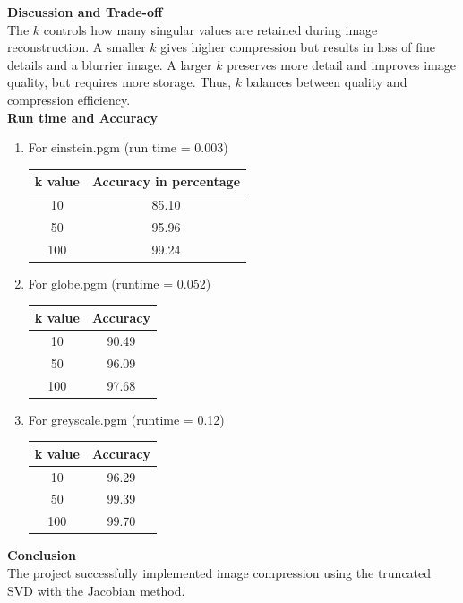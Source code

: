 \documentclass[journal]{IEEEtran}
\begin{document}
\textbf{Discussion and Trade-off}\\
The $k$ controls how many singular values are retained during image reconstruction.  
A smaller \(k\) gives higher compression but results in loss of fine details and a blurrier image.  
A larger \(k\) preserves more detail and improves image quality, but requires more storage.  
Thus, \(k\) balances between quality and compression efficiency.\\


\textbf{Run time and Accuracy}

\begin{enumerate}

\item For einstein.pgm 
(run time = 0.003)
\begin{table}[H]
    \centering
    \begin{tabular}{|c|c|}
        \hline
        \textbf{k value} & \textbf{Accuracy in percentage } \\  
        \hline
        10 & 85.10 \\                              
        \hline
        50 & 95.96 \\                         
        \hline
        100 & 99.24 \\       
        \hline
    \end{tabular}
       \label{tab:1}
\end{table}

\item For globe.pgm
(runtime = 0.052)
\begin{table}[H]
    \centering
    \begin{tabular}{|c|c|}
        \hline
        \textbf{k value} & \textbf{Accuracy} \\  
        \hline
        10 & 90.49 \\                              
        \hline
        50 & 96.09 \\                         
        \hline
        100 & 97.68\\       
        \hline
    \end{tabular}
    \label{tab:2}
\end{table}

\item For greyscale.pgm
(runtime = 0.12)
\begin{table}[H]
    \centering
    \begin{tabular}{|c|c|}
        \hline
        \textbf{k value} & \textbf{Accuracy} \\  
     \hline
        10 & 96.29 \\                              
        \hline
        50 & 99.39 \\                         
        \hline
        100 & 99.70 \\       
        \hline
    \end{tabular}
    \label{tab:3}
\end{table}

\end{enumerate}






\textbf{Conclusion}\\
The project successfully implemented image compression using the truncated SVD with the Jacobian method.  
\end{document}
